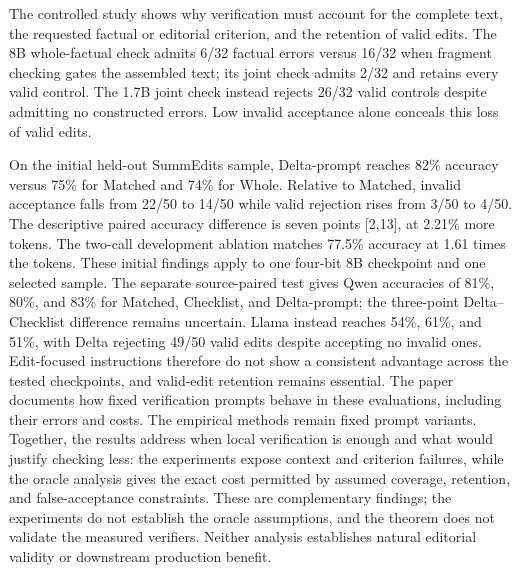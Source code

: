 \documentclass[10pt,letterpaper,twocolumn]{article}
\makeatletter
\renewcommand{\section}{\@startsection{section}{1}{0pt}{-2ex plus -.5ex minus -.2ex}{1.5ex plus .3ex minus .2ex}{\normalfont\fontsize{11}{13}\selectfont\bfseries\raggedright}}
\makeatother
\begin{document}
\section{CONCLUSION}
The controlled study shows why verification must account for the complete text, the requested factual or editorial criterion, and the retention of valid edits. The 8B whole-factual check admits 6/32 factual errors versus 16/32 when fragment checking gates the assembled text; its joint check admits 2/32 and retains every valid control. The 1.7B joint check instead rejects 26/32 valid controls despite admitting no constructed errors. Low invalid acceptance alone conceals this loss of valid edits.

On the initial held-out SummEdits sample, Delta-prompt reaches 82\% accuracy versus 75\% for Matched and 74\% for Whole. Relative to Matched, invalid acceptance falls from 22/50 to 14/50 while valid rejection rises from 3/50 to 4/50. The descriptive paired accuracy difference is seven points [2,13], at 2.21\% more tokens. The two-call development ablation matches 77.5\% accuracy at 1.61 times the tokens. These initial findings apply to one four-bit 8B checkpoint and one selected sample. The separate source-paired test gives Qwen accuracies of 81\%, 80\%, and 83\% for Matched, Checklist, and Delta-prompt; the three-point Delta--Checklist difference remains uncertain. Llama instead reaches 54\%, 61\%, and 51\%, with Delta rejecting 49/50 valid edits despite accepting no invalid ones. Edit-focused instructions therefore do not show a consistent advantage across the tested checkpoints, and valid-edit retention remains essential. The paper documents how fixed verification prompts behave in these evaluations, including their errors and costs. The empirical methods remain fixed prompt variants. Together, the results address when local verification is enough and what would justify checking less: the experiments expose context and criterion failures, while the oracle analysis gives the exact cost permitted by assumed coverage, retention, and false-acceptance constraints. These are complementary findings; the experiments do not establish the oracle assumptions, and the theorem does not validate the measured verifiers. Neither analysis establishes natural editorial validity or downstream production benefit.
\end{document}
